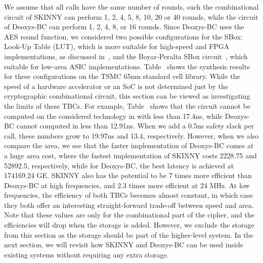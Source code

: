 \documentclass[conference]{IEEEtran}
\begin{document}
We assume that all calls have the same number of rounds, such the combinational circuit of SKINNY can perform 1, 2, 4, 5, 8, 10, 20 or 40 rounds, while the circuit of Deoxys-BC can perform 1, 2, 4, 8, or 16 rounds. Since Deoxys-BC uses the AES round function, we considered two possible configurations for the SBox: Look-Up Table (LUT), which is more suitable for high-speed and FPGA implementations, as discussed in~\cite{}, and the Boyar-Peralta SBox circuit~\cite{}, which suitable for low-area ASIC implementations. Table~\cite{tab:comptbc} shows the synthesis results for these configurations on the TSMC 65nm standard cell library. While the speed of a hardware accelerator or an SoC is not determined just by the cryptographic combinational circuit, this section can be viewed as investigating the limits of these TBCs. For example, Table~\cite{tab:comptbc} shows that the circuit cannot be computed on the considered technology in with less than 17.4ns, while Deoxys-BC cannot computed in less than 12.91ns. When we add a 0.5ns safety slack per call, these numbers grow to 19.97ns and 13.4, respectively. However, when we also compare the area, we see that the faster implementation of Deoxys-BC comes at a huge area cost, where the fastest implementation of SKINNY costs 2228.75 and 52892.5, respectively, while for Deoxys-BC, the best latency is achieved at 174169.24 GE. SKINNY also has the potential to be 7 times more efficient than Deoxys-BC at high frequencies, and 2.3 times more efficient at 24 MHz. At low frequencies, the efficiency of both TBCs becomes almost constant, in which case they both offer an interesting straight-forward trade-off between speed and area. Note that these values are only for the combinational part of the cipher, and the efficiencies will drop when the storage is added. However, we exclude the storage from this section as the storage should be part of the higher-level system. In the next section, we will revisit how SKINNY and Deoxys-BC can be used inside existing systems without requiring any extra storage.
\end{document}
